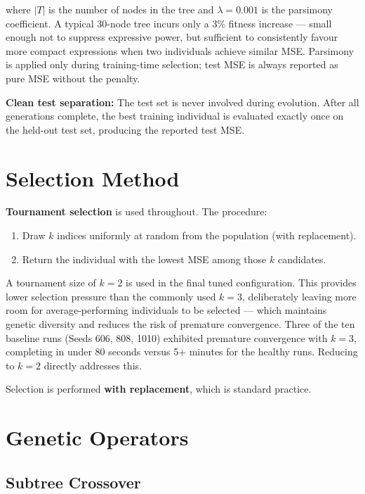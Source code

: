 \documentclass[12pt,a4paper]{article}
\begin{document}
where $|T|$ is the number of nodes in the tree and $\lambda = 0.001$ is the parsimony coefficient. A typical 30-node tree incurs only a 3\% fitness increase --- small enough not to suppress expressive power, but sufficient to consistently favour more compact expressions when two individuals achieve similar MSE. Parsimony is applied only during training-time selection; test MSE is always reported as pure MSE without the penalty.

\textbf{Clean test separation:} The test set is never involved during evolution. After all generations complete, the best training individual is evaluated exactly once on the held-out test set, producing the reported test MSE.

\section{Selection Method}

\textbf{Tournament selection} is used throughout. The procedure:

\begin{enumerate}
    \item Draw $k$ indices uniformly at random from the population (with replacement).
    \item Return the individual with the lowest MSE among those $k$ candidates.
\end{enumerate}

A tournament size of $k = 2$ is used in the final tuned configuration. This provides lower selection pressure than the commonly used $k = 3$, deliberately leaving more room for average-performing individuals to be selected --- which maintains genetic diversity and reduces the risk of premature convergence. Three of the ten baseline runs (Seeds 606, 808, 1010) exhibited premature convergence with $k = 3$, completing in under 80 seconds versus 5+ minutes for the healthy runs. Reducing to $k = 2$ directly addresses this.

Selection is performed \textbf{with replacement}, which is standard practice.

\section{Genetic Operators}

\subsection{Subtree Crossover}
\end{document}
